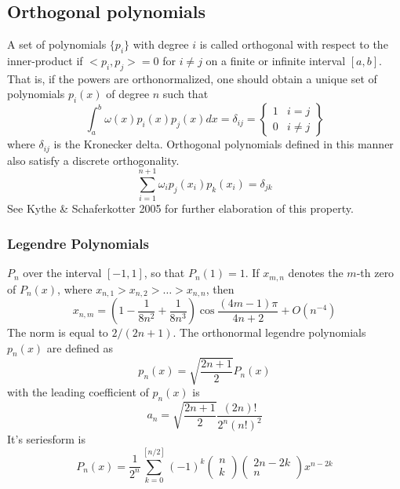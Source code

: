 \documentclass[%
reprint,
amsmath,amssymb,
aps,
]{revtex4-1}
\begin{document}
\subsection{Orthogonal polynomials} \noindent 
A set of polynomials $\{p_i\}$ with degree $i$ is called orthogonal with respect to the inner-product if $<p_i, p_j> = 0$ for $i\not = j$ on a finite or infinite interval $[a,b]$. That is, if the powers are orthonormalized, one should obtain a unique set of polynomials $p_i(x)$ of degree $n$ such that
\begin{equation}
	\int_{a}^{b} \omega(x)p_i(x)p_j(x)dx = \delta_{ij} = \left\{
	\begin{array}{ll}
	1 & i = j\\
	0 & i \not =j 
	\end{array} \right\}
\end{equation}
where $\delta_{ij}$ is the Kronecker delta. Orthogonal polynomials defined in this manner also satisfy a discrete orthogonality. 
\begin{equation}
	\sum_{i=1}^{n+1} \omega_i p_j(x_i)p_k(x_i) = \delta_{jk}
\end{equation}
See Kythe \& Schaferkotter 2005 for further elaboration of this property. 

\subsubsection{Legendre Polynomials}
$P_n$ over the interval $[-1,1]$, so that $P_n(1) = 1$. If $x_{m,n}$ denotes the $m$-th zero of $P_n(x)$, where $x_{n,1} > x_{n,2} > \dots > x_{n,n} $, then 
\begin{equation}
x_{n, m}=\left(1-\frac{1}{8 n^{2}}+\frac{1}{8 n^{3}}\right) \cos \frac{(4 m-1) \pi}{4 n+2}+O\left(n^{-4}\right)
\end{equation}
The norm is equal to $2/(2n+1)$. The orthonormal legendre polynomials $p_n(x)$ are defined as 
\begin{equation}
p_{n}(x)=\sqrt{\frac{2 n+1}{2}} P_{n}(x)
\end{equation}
with the leading coefficient of $p_n(x)$ is 
\begin{equation}
a_{n}=\sqrt{\frac{2 n+1}{2}} \frac{(2 n) !}{2^{n}(n !)^{2}}
\end{equation}
It's seriesform is
 \begin{equation}
 P_{n}(x)=\frac{1}{2^{n}} \sum_{k=0}^{[n / 2]}(-1)^{k}\left(\begin{array}{l}{n} \\ {k}\end{array}\right)\left(\begin{array}{c}{2 n-2 k} \\ {n}\end{array}\right) x^{n-2 k}
 \end{equation}
\end{document}
